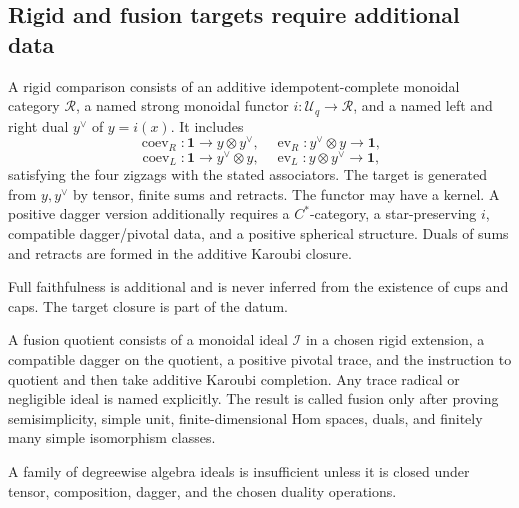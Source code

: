 \subsection{Rigid and fusion targets require additional data}

\begin{definition}
A rigid comparison consists of an additive idempotent-complete monoidal
category $\mathcal R$, a named strong monoidal functor
$i:\mathcal U_q\to\mathcal R$, and a named left and right dual $y^\vee$ of
$y=i(x)$.  It includes
\[
 \operatorname{coev}_R:\mathbf1\to y\otimes y^\vee,
 \quad \operatorname{ev}_R:y^\vee\otimes y\to\mathbf1,
\]
\[
 \operatorname{coev}_L:\mathbf1\to y^\vee\otimes y,
 \quad \operatorname{ev}_L:y\otimes y^\vee\to\mathbf1,
\]
satisfying the four zigzags with the stated associators.  The target is
generated from $y,y^\vee$ by tensor, finite sums and retracts.  The functor
may have a kernel.  A positive dagger version additionally requires a
$C^*$-category, a star-preserving $i$, compatible dagger/pivotal data, and a
positive spherical structure.  Duals of sums and retracts are formed in the
additive Karoubi closure.
\end{definition}
\begin{scope}
Full faithfulness is additional and is never inferred from the existence of
cups and caps.  The target closure is part of the datum.
\end{scope}

\begin{definition}
A fusion quotient consists of a monoidal ideal $\mathcal I$ in a chosen
rigid extension, a compatible dagger on the quotient, a positive pivotal
trace, and the instruction to quotient and then take additive Karoubi
completion.  Any trace radical or negligible ideal is named explicitly.
The result is called fusion only after proving semisimplicity, simple unit,
finite-dimensional Hom spaces, duals, and finitely many simple isomorphism
classes.
\end{definition}
\begin{scope}
A family of degreewise algebra ideals is insufficient unless it is closed
under tensor, composition, dagger, and the chosen duality operations.
\end{scope}

